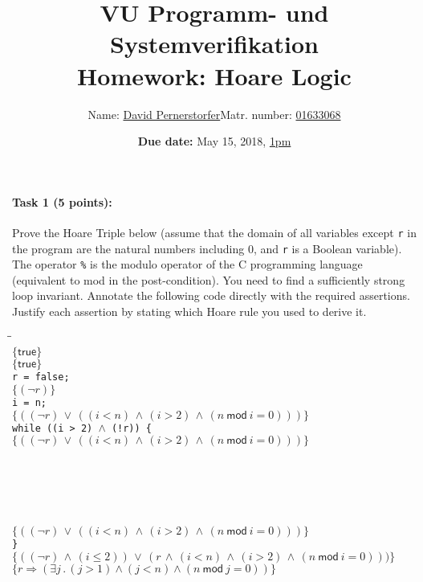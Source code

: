 \documentclass[11pt,a4paper]{article}
\title{VU Programm- und Systemverifikation\\
\Large Homework: Hoare Logic}
\author{Name: \underline{David Pernerstorfer}\qquad Matr. number: \underline{01633068}}
\date{{\bf Due date:} May 15, 2018, \underline{1pm}}
\begin{document}
\maketitle

\paragraph{Task 1 (5 points):}
Prove the Hoare Triple below (assume that the domain of
all variables except {\tt r} in the program are the natural numbers
including 0, and {\tt r} is a Boolean variable). The operator
{\tt\%} is the modulo operator of the C programming language
(equivalent to {\sf mod} in the post-condition).
You need to find a sufficiently strong loop invariant.
Annotate the following code directly with the required assertions.
Justify each assertion by stating which Hoare rule you used
to derive it.

\newpage

\begin{tabbing}
  \quad\=\quad\=\quad\=\\\kill
  $\{\mathsf{true}\}$\\[5ex]
  $\{\mathsf{true}\}$\\[2.5ex]
  {\tt r = false;}\\[2.5ex]
  $\{ (\neg r)\}$\\[2.5ex]
  {\tt i = n;}\\[2.5ex]
  $\{ ((\neg r) \, \vee \, ((i < n) \,\wedge \, (i > 2) \, \wedge \, (n~\mathsf{mod}~i = 0))) \}$\\[2.5ex]
  {\tt while ((i > 2) $\wedge$ (!r)) \{}\\[2.5ex]
  \>$\{ ((\neg r) \, \vee \, ((i < n) \,\wedge \, (i > 2) \, \wedge \, (n~\mathsf{mod}~i = 0))) \}$\\[2.5ex]
  \\[2.5ex]
  \\[2.5ex]
  \>\\[2.5ex]
  \\[2.5ex]
  \>\\[2.5ex]
  \>$\{ ((\neg r) \, \vee \, ((i < n) \,\wedge \, (i > 2) \, \wedge \, (n~\mathsf{mod}~i = 0))) \}$\\[2.5ex]
  {\tt \}}\\[2.5ex]
  $\{ ((\neg r) \, \wedge \, (i \le 2)) \, \vee \, (r \, \wedge \, (i < n) \, \wedge \, (i > 2) \, \wedge \, (n~\mathsf{mod}~i = 0))) \}$\\[5ex]
  $\{ r\Rightarrow \left(\exists j\,.\,(j>1)\wedge(j<n)\wedge(n~\mathsf{mod}~j = 0)\right)\}$
\end{tabbing}
\end{document}
